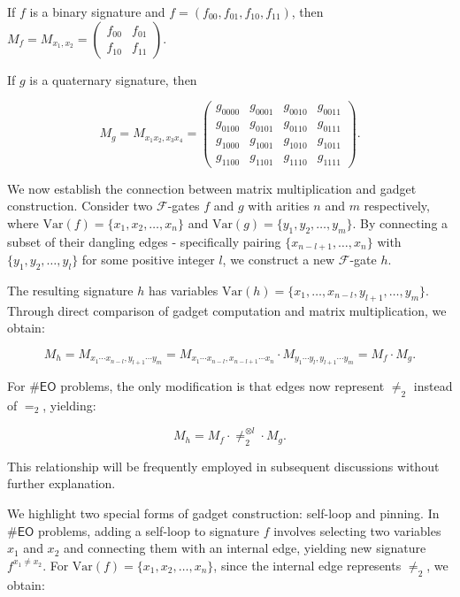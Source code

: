 \documentclass[a4paper,UKenglish,cleveref, autoref, thm-restate]{lipics-v2021}
\newcommand{\eo}[0]{\textsf{EO}}
\begin{document}
\begin{example}
    If $f$ is a binary signature and $f=(f_{00},f_{01},f_{10},f_{11})$, then $M_f=M_{x_1,x_2}=\left(\begin{matrix}
f_{00} & f_{01} \\
f_{10} & f_{11}
\end{matrix}\right)$.

If $g$ is a quaternary signature, then

$$M_g=M_{x_1x_2,x_3x_4}=\left(\begin{matrix}
g_{0000} & g_{0001} & g_{0010} & g_{0011}\\
g_{0100} & g_{0101} & g_{0110} & g_{0111}\\
g_{1000} & g_{1001} & g_{1010} & g_{1011}\\
g_{1100} & g_{1101} & g_{1110} & g_{1111}
\end{matrix}\right).$$

\end{example}

We now establish the connection between matrix multiplication and gadget construction. Consider two $\mathcal{F}$-gates $f$ and $g$ with arities $n$ and $m$ respectively, where $\text{Var}(f)=\{x_1,x_2,\ldots,x_n\}$ and $\text{Var}(g)=\{y_1,y_2,\ldots,y_m\}$. By connecting a subset of their dangling edges - specifically pairing $\{x_{n-l+1},\ldots,x_n\}$ with $\{y_1,y_2,\ldots,y_l\}$ for some positive integer $l$, we construct a new $\mathcal{F}$-gate $h$.

The resulting signature $h$ has variables $\text{Var}(h)=\{x_1,\ldots,x_{n-l},y_{l+1},\ldots,y_m\}$. Through direct comparison of gadget computation and matrix multiplication, we obtain:

$$M_h=M_{x_1\cdots x_{n-l},y_{l+1}\cdots y_m}=M_{x_1\cdots x_{n-l},x_{n-l+1}\cdots x_n}\cdot M_{y_1\cdots y_l,y_{l+1}\cdots y_m}=M_f\cdot M_g.$$

For $\#\eo$ problems, the only modification is that edges now represent $\neq_2$ instead of $=_2$, yielding:

$$M_h=M_f\cdot \neq_2^{\otimes l}\cdot M_g.$$

This relationship will be frequently employed in subsequent discussions without further explanation.

We highlight two special forms of gadget construction: self-loop and pinning. In $\#\eo$ problems, adding a self-loop to signature $f$ involves selecting two variables $x_1$ and $x_2$ and connecting them with an internal edge, yielding new signature $f^{x_1\neq x_2}$. For $\text{Var}(f)=\{x_1,x_2,\ldots,x_n\}$, since the internal edge represents $\neq_2$, we obtain:
\end{document}
